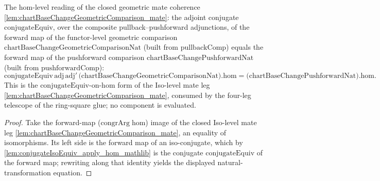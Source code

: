 \begin{lemma}


  \label{lem:ring_square_glue_geom_leg_nat}
  The hom-level reading of the closed geometric mate coherence
  \cref{lem:chartBaseChangeGeometricComparison_mate}: the adjoint conjugate \(\mathrm{conjugateEquiv}\),
  over the composite pullback--pushforward adjunctions, of the forward map of the functor-level
  geometric comparison \(\mathrm{chartBaseChangeGeometricComparisonNat}\) (built from
  \(\mathrm{pullbackComp}\)) equals the forward map of the pushforward comparison
  \(\mathrm{chartBaseChangePushforwardNat}\) (built from \(\mathrm{pushforwardComp}\)):
  \[
    \mathrm{conjugateEquiv}\,\mathrm{adj}\,\mathrm{adj}'\,
      \bigl(\mathrm{chartBaseChangeGeometricComparisonNat}\bigr).\mathrm{hom}
      = \bigl(\mathrm{chartBaseChangePushforwardNat}\bigr).\mathrm{hom}.
  \]
  This is the \(\mathrm{conjugateEquiv}\)-on-\(\mathrm{hom}\) form of the Iso-level mate leg
  \cref{lem:chartBaseChangeGeometricComparison_mate}, consumed by the four-leg telescope of the
  ring-square glue; no component is evaluated.
  \begin{proof}
    Take the forward-map (\(\mathrm{congrArg}\;\mathrm{hom}\)) image of the closed Iso-level mate leg
    \cref{lem:chartBaseChangeGeometricComparison_mate}, an equality of isomorphisms. Its left side is
    the forward map of an iso-conjugate, which by \cref{lem:conjugateIsoEquiv_apply_hom_mathlib} is the
    conjugate \(\mathrm{conjugateEquiv}\) of the forward map; rewriting along that identity yields the
    displayed natural-transformation equation.
  \end{proof}
\end{lemma}

